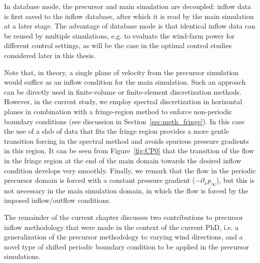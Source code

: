 In database mode, the precursor and main simulation are decoupled: inflow data is first saved to the inflow database, after which it is read by the main simulation at a later stage. The advantage of database mode is that identical inflow data can be reused by multiple simulations, e.g. to evaluate the wind-farm power for different control settings, as will be the case in the optimal control studies considered later in this thesis. 

Note that, in theory, a single plane of velocity from the precursor simulation would suffice as an inflow condition for the main simulation. Such an approach can be directly used in finite-volume or finite-element discretization methods. However, in the current study, we employ spectral discretization in horizontal planes in combination with a fringe-region method to enforce non-periodic boundary conditions (see discussion in Section~\ref{sec:meth_fringe}). In this case the use of a slab of data that fits the fringe region provides a more gentle transition forcing in the spectral method and avoids spurious pressure gradients in this region. It can be seen from Figure~\ref{fig:CP0} that the transition of the flow in the fringe region at the end of the main domain towards the desired inflow condition develops very smoothly. Finally, we remark that the flow in the periodic precursor domain is forced with a constant pressure gradient ($-\partial_x p_\infty$), but this is not necessary in the main simulation domain, in which the flow is forced by the imposed inflow/outflow conditions.

The remainder of the current chapter discusses two contributions to precursor inflow methodology that were made in the context of the current PhD,
i.e. a generalization of the precursor methodology to varying wind directions, and a novel type of shifted periodic boundary condition to be applied
in the precursor simulations. 

